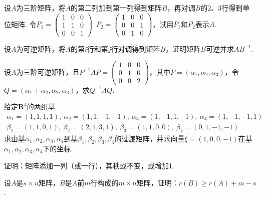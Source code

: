 \begin{exercise}

    \begin{exgroup}
        \item 设$A$为三阶矩阵，将$A$的第二列加到第一列得到矩阵$B$，再对调$B$的2、3行得到单位矩阵. 令$P_1=\begin{pmatrix}1 & 0 & 0 \\ 1 & 1 & 0 \\ 0 & 0 & 1\end{pmatrix}\enspace P_2=\begin{pmatrix}1 & 0 & 0 \\ 0 & 0 & 1 \\ 0 & 1 & 0\end{pmatrix}$，试用$P_1$和$P_2$表示$A$.

        \item 设$A$为可逆矩阵，将$A$的第$i$行和第$j$行对调得到矩阵$B$，证明矩阵$B$可逆并求$AB^{-1}$.

        \item 设$A$为三阶可逆矩阵，且$P^{-1}AP=\begin{pmatrix}1 & 0 & 0 \\ 0 & 1 & 0 \\ 0 & 0 & 2\end{pmatrix}$，其中$P=(\alpha_1,\alpha_2,\alpha_3)$，令$Q=(\alpha_1+\alpha_2,\alpha_2,\alpha_3)$，求$Q^{-1}AQ$.

        \item 给定$\mathbf{R}^4$的两组基
        \begin{gather*}
            \alpha_1=(1,1,1,1),\ \alpha_2=(1,1,-1,-1),\ \alpha_3=(1,-1,1,-1),\ \alpha_4=(1,-1,-1,1) \\
            \beta_1=(1,1,0,1),\ \beta_2=(2,1,3,1),\ \beta_3=(1,1,0,0),\ \beta_4=(0,1,-1,-1)
        \end{gather*}
        求由基$\alpha_1,\alpha_2,\alpha_3,\alpha_4$到基$\beta_1,\beta_2,\beta_3,\beta_4$的过渡矩阵，并求向量$\xi=(1,0,0,-1)$在基$\alpha_1,\alpha_2,\alpha_3,\alpha_4$下的坐标.

        \item 证明：矩阵添加一列（或一行），其秩或不变，或增加1.

        \item 设$A$是$s \times n$矩阵，$B$是$A$前$m$行构成的$m \times n$矩阵，证明：$r(B) \geqslant r(A) + m - s$.
    \end{exgroup}


\end{exercise}
